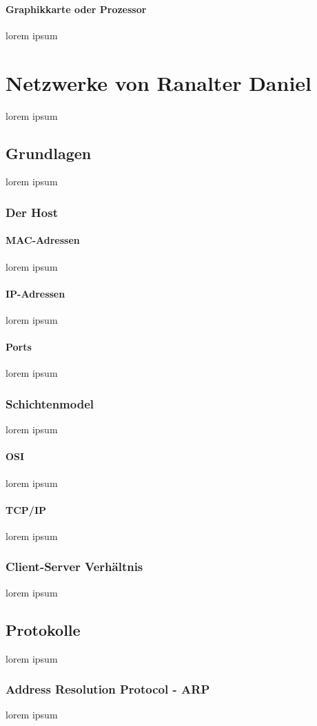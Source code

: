 \documentclass[10pt,a4paper]{report}
\begin{document}
\paragraph{Graphikkarte oder Prozessor}
lorem ipsum
\section{Netzwerke von Ranalter Daniel}
lorem ipsum
\subsection{Grundlagen}
lorem ipsum
\subsubsection{Der Host}
\paragraph{MAC-Adressen}
lorem ipsum
\paragraph{IP-Adressen}
lorem ipsum
\paragraph{Ports}
lorem ipsum
\subsubsection{Schichtenmodel}
lorem ipsum
\paragraph{OSI}
lorem ipsum
\paragraph{TCP/IP}
lorem ipsum
\subsubsection{Client-Server Verhältnis}
lorem ipsum
\subsection{Protokolle}
lorem ipsum
\subsubsection{Address Resolution Protocol - ARP}
lorem ipsum
\end{document}
